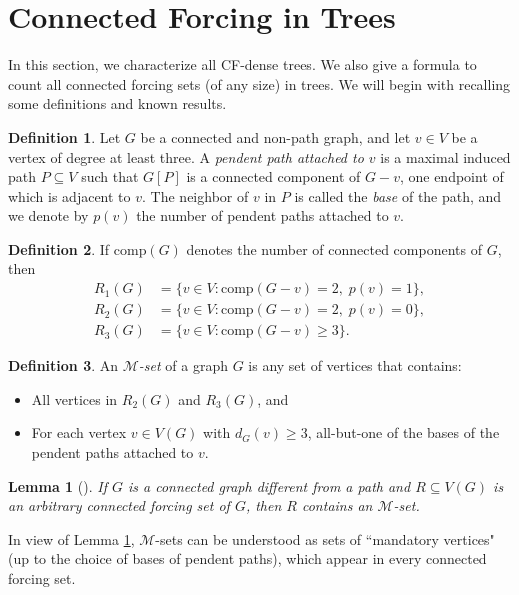 \documentclass[11pt]{article}
\newtheorem{lem}[thm]{Lemma}
\theoremstyle{definition}
\newtheorem{definition}{Definition}
\newcommand{\comp}{\mathrm{comp}}
\newcommand{\1}{\vspace{0.1cm}}
\newcommand{\2}{\vspace{0.2cm}}
\newcommand{\3}{\vspace{0.3cm}}
\begin{document}
\section{Connected Forcing in Trees}\label{sec:trees-and-unicyclic}
In this section, we characterize all CF-dense trees. We also give a formula to count all connected forcing sets (of any size) in trees. We will begin with recalling some definitions and known results. 

\begin{definition}
Let $G$ be a connected and non-path graph, and let $ v \in V $ be a vertex of degree at least three. A \emph{pendent path attached to $ v $} is a maximal induced path $ P \subseteq V $ such that $ G[P] $ is a connected component of $ G - v $, one endpoint of which is adjacent to $ v $. The neighbor of $ v $ in $ P $ is called the \emph{base} of the path, and we denote by $ p(v) $ the number of pendent paths attached to $ v $.
\end{definition}

\begin{definition}
If $\comp(G)$ denotes the number of connected components of $ G $, then
\begin{align*}
R_1(G) &= \{ v \in V : \comp(G - v) = 2,\; p(v) = 1 \}, \\
R_2(G) &= \{ v \in V : \comp(G - v) = 2,\; p(v) = 0 \}, \\
R_3(G) &= \{ v \in V : \comp(G - v) \ge 3 \}.
\end{align*}
\end{definition}
\begin{definition}
An \emph{$ \mathcal{M} $-set} of a graph $ G $ is any set of vertices that contains:
\begin{itemize}
    \item[1)] All vertices in $ R_2(G) $ and $ R_3(G) $, and
    \item[2)] For each vertex $ v \in V(G) $ with $d_G(v) \ge 3$, all-but-one of the bases of the pendent paths attached to $ v $.
\end{itemize}
\end{definition}

\begin{lem}[\cite{cf-complexity}]
\label{MR_lemma}
If $G$ is a connected graph different from a path and $R \subseteq V(G)$ is an arbitrary connected forcing set of $G$, then $R$ contains an $\mathcal{M}$-set.
\end{lem}
In view of Lemma \ref{MR_lemma}, $\mathcal{M}$-sets can be understood as sets of ``mandatory vertices" (up to the choice of bases of pendent paths), which appear in every connected forcing set.
\end{document}
